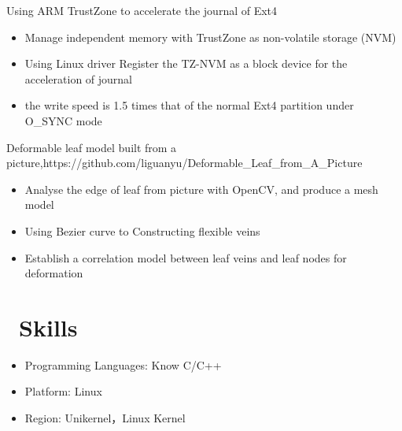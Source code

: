 \documentclass{resume}
\begin{document}
Using ARM TrustZone to accelerate the journal of Ext4
\begin{itemize}
  \item Manage independent memory with TrustZone as non-volatile storage (NVM)
  \item Using Linux driver Register the TZ-NVM as a block device for the acceleration of journal
  \item the write speed is 1.5 times that of the normal Ext4 partition under O\_SYNC mode
\end{itemize}

Deformable leaf model built from a picture,https://github.com/liguanyu/Deformable\_Leaf\_from\_A\_Picture
\begin{itemize}
  \item Analyse the edge of leaf from picture with OpenCV, and produce a mesh model
  \item Using Bezier curve to Constructing flexible veins
  \item Establish a correlation model between leaf veins and leaf nodes for deformation
\end{itemize}


\section{\faCogs\ Skills}
\begin{itemize}[parsep=0.5ex]
  \item Programming Languages: Know C/C++
  \item Platform: Linux
  \item Region: Unikernel，Linux Kernel
\end{itemize}
\end{document}
